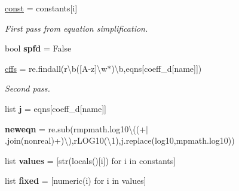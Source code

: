 \begin{DoxyCompactItemize}
\item 
\mbox{\hyperlink{namespacesimplify__rates_a39faabc858790d5788b9077e58bd20fc}{const}} = constants\mbox{[}i\mbox{]}
\begin{DoxyCompactList}\small\item\em First pass from equation simplification. \end{DoxyCompactList}\item 
\mbox{\label{namespacesimplify__rates_a6a7252cbdd68227b6ccbb17ee90e8fa2}} 
bool {\bfseries spfd} = False
\item 
\mbox{\label{namespacesimplify__rates_a229dbb8f6a9d8a4142256188f3efa7a4}} 
\mbox{\hyperlink{namespacesimplify__rates_a229dbb8f6a9d8a4142256188f3efa7a4}{cffs}} = re.\+findall(r\textquotesingle{}\textbackslash{}b(\mbox{[}A-\/z\mbox{]}\textbackslash{}w$\ast$)\textbackslash{}b\textquotesingle{},eqns\mbox{[}coeff\+\_\+d\mbox{[}name\mbox{]}\mbox{]})
\begin{DoxyCompactList}\small\item\em Second pass. \end{DoxyCompactList}\item 
\mbox{\label{namespacesimplify__rates_aedb66986f43a0c635e57c7368c48a2ec}} 
list {\bfseries j} = eqns\mbox{[}coeff\+\_\+d\mbox{[}name\mbox{]}\mbox{]}
\item 
\mbox{\label{namespacesimplify__rates_a76d1ab81ce30b654efc37f33cde1962b}} 
{\bfseries neweqn} = re.\+sub(r\textquotesingle{}mpmath.\+log10\textbackslash{}((\textquotesingle{}+\textquotesingle{}$\vert$\textquotesingle{}.join(nonreal)+\textquotesingle{})\textbackslash{})\textquotesingle{},r\textquotesingle{}L\+O\+G10(\textbackslash{}1)\textquotesingle{},j.\+replace(\textquotesingle{}log10\textquotesingle{},\textquotesingle{}mpmath.\+log10\textquotesingle{}))
\item 
\mbox{\label{namespacesimplify__rates_a9681db7e2db921306dd2ee456f65bc61}} 
list {\bfseries values} = \mbox{[}str(locals()\mbox{[}i\mbox{]}) for i in constants\mbox{]}
\item 
\mbox{\label{namespacesimplify__rates_ab466add2abba2a60a035d1655ebb7c0f}} 
list {\bfseries fixed} = \mbox{[}numeric(i) for i in values\mbox{]}

\end{DoxyCompactItemize}
